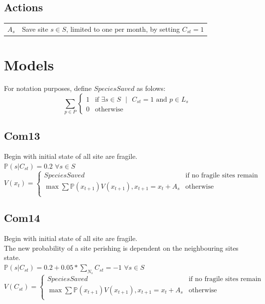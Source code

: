 \documentclass{article}
\begin{document}
	\subsection*{Actions}
	\begin{tabular}{rl}
		$A_s$ & Save site $s\in S$, limited to one per month, by setting $C_{st} = 1$
	\end{tabular}

	\section*{Models}
	For notation purposes, define $SpeciesSaved$ as folows:
	\begin{equation*}
		\sum_{p\in P} \begin{cases}
			1 & \text{if $\exists s\in S$ $|$ $C_{st} = 1$ and $p\in L_s$}\\
			0 & \text{otherwise}
		\end{cases}
	\end{equation*}

	\subsection*{Com13}
	Begin with initial state of all site are fragile.\\
	$\mathds{P}(s | C_{st}) = 0.2$ $\forall s\in S$\\
	\begin{equation*}
	 	V(x_t) = \begin{cases}
			SpeciesSaved & \text{if no fragile sites remain}\\
			\max{} \sum \mathds{P}(x_{t+1})V(x_{t+1}), x_{t+1} = x_t + A_s & \text{otherwise}\\
		\end{cases}
	\end{equation*}

	\subsection*{Com14}
	Begin with initial state of all site are fragile.\\
	The new probability of a site perishing is dependent on the neighbouring sites state.\\
	$\mathds{P}(s | C_{st}) = 0.2 + 0.05 * \sum_{N_s} C_{st} = -1$ $\forall s\in S$\\
	\begin{equation*}
	 	V(C_{st}) = \begin{cases}
			SpeciesSaved & \text{if no fragile sites remain}\\
			\max{} \sum \mathds{P}(x_{t+1})V(x_{t+1}), x_{t+1} = x_t + A_s & \text{otherwise}\\
		\end{cases}
	\end{equation*}
\end{document}
